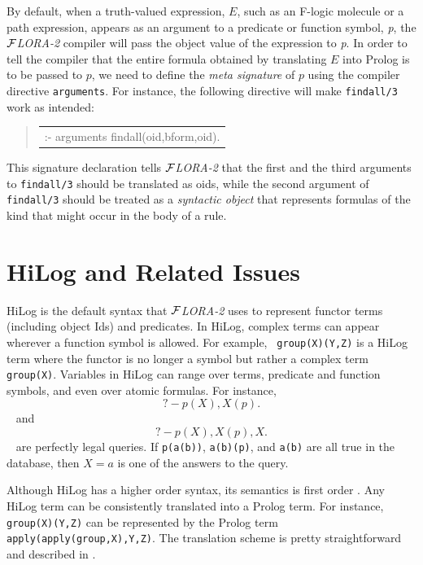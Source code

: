 \documentclass[11pt]{article}
\newenvironment{qrules}{\begin{quote}\tt\begin{tabular}[t]{l}}%
{\end{tabular}\end{quote}}
\newcommand{\FLORA}{{\mbox{${\cal F}${\small\it LORA}\rm\emph{-2}}}\xspace}
\newcommand{\fl}{\mbox{F-logic}\xspace}
\begin{document}
%
By default, when a truth-valued expression, $E$, such as an \fl molecule or
a path expression, appears as an argument to a predicate or function
symbol, {\it p}, the \FLORA compiler will pass the object value of the
expression to {\it p}. In order to tell the compiler that the entire
formula obtained by translating $E$ into Prolog is to be passed to $p$, we
need to define the \emph{meta signature} of $p$ using the compiler
directive {\tt arguments}.  For instance, the following directive will make
{\tt findall/3} work as intended:
\begin{qrules}
:- arguments findall(oid,bform,oid).
\end{qrules}
This signature declaration tells \FLORA that the first and the third
arguments to {\tt findall/3} should be translated as oids, while the second
argument of {\tt findall/3} should be treated as a {\em syntactic object\/}
that represents formulas of the kind that might occur in the body of a
rule.



\section{HiLog and Related Issues} \label{sec:hilog}


%
HiLog \cite{hilog-jlp} is the default syntax that \FLORA uses to represent
functor terms (including object Ids) and predicates.  In HiLog, complex
terms can appear wherever a function symbol is allowed. For example, {\tt
  group(X)(Y,Z)} is a HiLog term where the functor is no longer a symbol
but rather a complex term {\tt group(X)}. Variables in HiLog can range over
terms, predicate and function symbols, and even over atomic formulas. For
instance,
{\tt
\begin{equation}
 ?- p(X), X(p).
\end{equation}
}
\noindent
and
{\tt
\begin{equation}\label{eq-hilog-notallowed}
 ?- p(X), X(p), X.  
\end{equation}
}
are perfectly legal queries. If {\tt p(a(b))}, {\tt a(b)(p)},
and {\tt a(b)} are all true in the database, then $X=a$ is one of the
answers to the query.

%
Although HiLog has a higher order syntax, its semantics is first order
\cite{hilog-jlp}. Any HiLog term can be consistently translated into a
Prolog term. For instance, {\tt group(X)(Y,Z)} can be represented by the
Prolog term {\tt apply(apply(group,X),Y,Z)}. The translation scheme is
pretty straightforward and described in \cite{hilog-jlp}.
\end{document}

